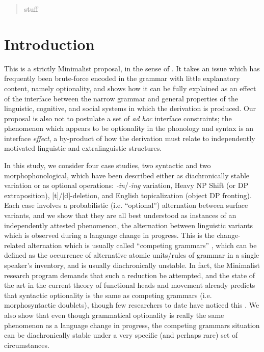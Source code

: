 \date{Received: date / Accepted: date}


\maketitle

\begin{abstract}
stuff
\end{abstract}

\section{Introduction}
\label{intro}

This is a strictly Minimalist proposal, in the sense of \citet{chomsky1993, chomsky1995, chomsky1998,chomsky2001}. It takes an issue which has frequently been brute-force encoded in the grammar with little explanatory content, namely optionality, and shows how it can be fully explained as an effect of the interface between the narrow grammar and general properties of the linguistic, cognitive, and social systems in which the derivation is produced. Our proposal is also not to postulate a set of \textsl{ad hoc} interface constraints; the phenomenon which appears to be optionality in the phonology and syntax is an interface \textsl{effect}, a by-product of how the derivation must relate to independently motivated linguistic and extralinguistic structures.

In this study, we consider four case studies, two syntactic and two morphophonological, which have been described either as diachronically stable variation or as optional operations: \textsl{-in}/\textsl{-ing} variation, Heavy NP Shift (or DP extraposition), [t]/[d]-deletion, and English topicalization (object DP fronting). Each case involves a probabilistic (i.e. ``optional'') alternation between surface variants, and we show that they are all best understood as instances of an independently attested phenomenon, the alternation between linguistic variants which is observed during a language change in progress. This is the change-related alternation which is usually called ``competing grammars'' \citep[][]{kroch1989}, which can be defined as the occurrence of alternative atomic units/rules of grammar in a single speaker's inventory, and is usually diachronically unstable. In fact, the Minimalist research program demands that such a reduction be attempted, and the state of the art in the current  theory of functional heads and movement already predicts that syntactic optionality is the same as competing grammars (i.e. morphosyntactic doublets), though few researchers to date have noticed this \citep[with the exception of][]{kroch1994}. We also show that even though grammatical optionality is really the same phenomenon as a language change in progress, the competing grammars situation can be diachronically stable under a very specific (and perhaps rare) set of circumstances. 
  
